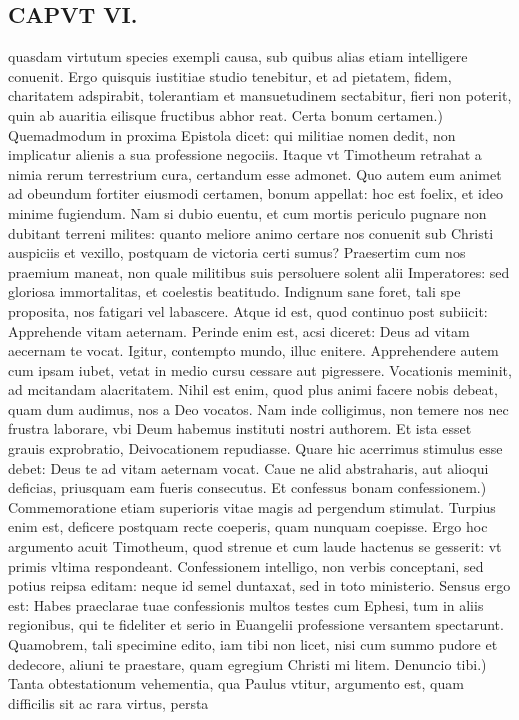 \documentclass{article}
\begin{document}
\begin{pages}
\section*{CAPVT VI. }
\marginpar{[ p.79 ]}\pstart quasdam virtutum species exempli causa, sub quibus alias etiam intelligere conuenit. Ergo quisquis iustitiae studio tenebitur, et ad pietatem, fidem, charitatem adspirabit, tolerantiam et mansuetudinem sectabitur, fieri non poterit, quin ab auaritia eilisque fructibus abhor reat.  \pend\pstart Certa bonum certamen.) Quemadmodum in proxima Epistola dicet: qui militiae nomen dedit, non implicatur alienis a sua professione negociis. Itaque vt Timotheum retrahat a nimia rerum terrestrium cura, certandum esse admonet. Quo autem eum animet ad obeundum fortiter eiusmodi certamen, bonum appellat: hoc est foelix, et ideo minime fugiendum. Nam si dubio euentu, et cum mortis periculo pugnare non dubitant terreni milites: quanto meliore animo certare nos conuenit sub Christi auspiciis et vexillo, postquam de victoria certi sumus? Praesertim cum nos praemium maneat, non quale militibus suis persoluere solent alii Imperatores: sed gloriosa immortalitas, et coelestis beatitudo. Indignum sane foret, tali spe proposita, nos fatigari vel labascere. Atque id est, quod continuo post subiicit: Apprehende vitam aeternam. Perinde enim est, acsi diceret: Deus ad vitam aecernam te vocat. Igitur, contempto mundo, illuc enitere. Apprehendere autem cum ipsam iubet, vetat in medio cursu cessare aut pigressere. Vocationis meminit, ad mcitandam alacritatem. Nihil est enim, quod plus animi facere nobis debeat, quam dum audimus, nos a Deo vocatos. Nam inde colligimus, non temere nos nec frustra laborare, vbi Deum habemus instituti nostri authorem. Et ista esset grauis exprobratio, Deivocationem repudiasse. Quare hic acerrimus stimulus esse debet: Deus te ad vitam aeternam vocat. Caue ne alid abstraharis, aut alioqui deficias, priusquam eam fueris consecutus.  \pend\pstart Et confessus bonam confessionem.) Commemoratione etiam superioris vitae magis ad pergendum stimulat. Turpius enim est, deficere postquam recte coeperis, quam nunquam coepisse. Ergo hoc argumento acuit Timotheum, quod strenue et cum laude hactenus se gesserit: vt primis vltima respondeant. Confessionem intelligo, non verbis conceptani, sed potius reipsa editam: neque id semel duntaxat, sed in toto ministerio. Sensus ergo est: Habes praeclarae tuae confessionis multos testes cum Ephesi, tum in aliis regionibus, qui te fideliter et serio in Euangelii professione versantem spectarunt. Quamobrem, tali specimine edito, iam tibi non licet, nisi cum summo pudore et dedecore, aliuni te praestare, quam egregium Christi mi litem.  \pend\pstart Denuncio tibi.) Tanta obtestationum vehementia, qua Paulus vtitur, argumento est, quam difficilis sit ac rara virtus, persta\pend

\end{pages}
\end{document}
